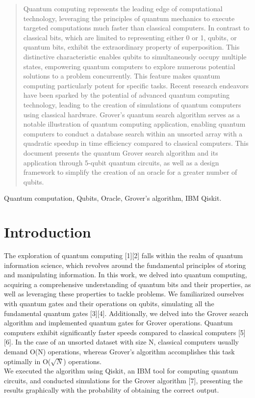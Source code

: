 \documentclass[conference]{IEEEtran}
\begin{document}
\begin{abstract}
	Quantum computing represents the leading edge of
	computational technology, leveraging the principles of quantum
	mechanics to execute targeted computations much faster than
	classical computers. In contrast to classical bits, which are limited
	to representing either 0 or 1, qubits, or quantum bits, exhibit
	the extraordinary property of superposition. This distinctive
	characteristic enables qubits to simultaneously occupy multiple
	states, empowering quantum computers to explore numerous
	potential solutions to a problem concurrently. This feature
	makes quantum computing particularly potent for specific tasks.
	Recent research endeavors have been sparked by the potential
	of advanced quantum computing technology, leading to the
	creation of simulations of quantum computers using classical
	hardware. Grover’s quantum search algorithm serves as a notable
	illustration of quantum computing application, enabling quantum
	computers to conduct a database search within an unsorted array
	with a quadratic speedup in time efficiency compared to classical
	computers. This document presents the quantum Grover search
	algorithm and its application through 5-qubit quantum circuits,
	as well as a design framework to simplify the creation of an
	oracle for a greater number of qubits.
\end{abstract}

\begin{IEEEkeywords}
	Quantum computation, Qubits, Oracle, Grover’s
	algorithm, IBM Qiskit.
\end{IEEEkeywords}

\section{Introduction}
The exploration of quantum computing [1][2] falls within
the realm of quantum information science, which revolves
around the fundamental principles of storing and manipulating
information. In this work, we delved into quantum computing,
acquiring a comprehensive understanding of quantum bits
and their properties, as well as leveraging these properties
to tackle problems. We familiarized ourselves with quantum
gates and their operations on qubits, simulating all the fundamental quantum gates [3][4]. Additionally, we delved into the
Grover search algorithm and implemented quantum gates for
Grover operations. Quantum computers exhibit significantly
faster speeds compared to classical computers [5][6]. In the
case of an unsorted dataset with size N, classical computers
usually demand O(N) operations, whereas Grover’s algorithm
accomplishes this task optimally in O($\sqrt{N}$) operations.
\\
We
executed the algorithm using Qiskit, an IBM tool for computing quantum circuits, and conducted simulations for the
Grover algorithm [7], presenting the results graphically with
the probability of obtaining the correct output.
\end{document}
